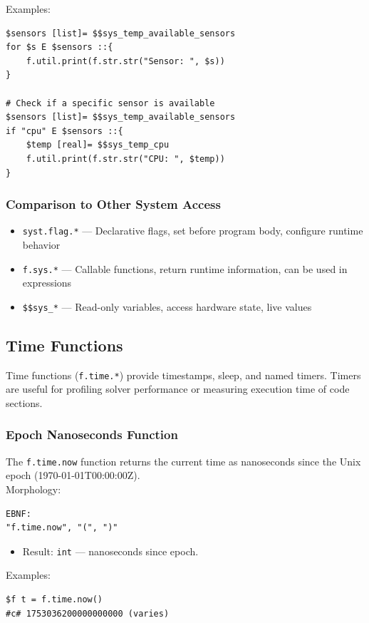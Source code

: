 Examples:
\begin{verbatim}
$sensors [list]= $$sys_temp_available_sensors
for $s E $sensors ::{
    f.util.print(f.str.str("Sensor: ", $s))
}

# Check if a specific sensor is available
$sensors [list]= $$sys_temp_available_sensors
if "cpu" E $sensors ::{
    $temp [real]= $$sys_temp_cpu
    f.util.print(f.str.str("CPU: ", $temp))
}
\end{verbatim}

\subsubsection{Comparison to Other System Access}
\begin{itemize}
\item \texttt{syst.flag.*} --- Declarative flags, set before program body, configure runtime behavior
\item \texttt{f.sys.*} --- Callable functions, return runtime information, can be used in expressions
\item \texttt{\$\$sys\_*} --- Read-only variables, access hardware state, live values
\end{itemize}

\subsection{Time Functions}

Time functions (\texttt{f.time.*}) provide timestamps, sleep, and named timers. Timers are useful for profiling solver performance or measuring execution time of code sections.

\subsubsection{Epoch Nanoseconds Function}
The \texttt{f.time.now} function returns the current time as nanoseconds since the Unix epoch (1970-01-01T00:00:00Z). \\
Morphology:
\begin{verbatim}
EBNF:
"f.time.now", "(", ")"
\end{verbatim}
\begin{itemize}
\item Result: \texttt{int} --- nanoseconds since epoch.
\end{itemize}
Examples:
\begin{verbatim}
$f t = f.time.now()
#c# 1753036200000000000 (varies)
\end{verbatim}

